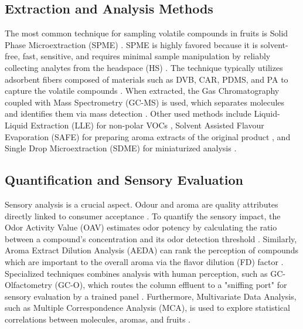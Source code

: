 \subsection{Extraction and Analysis Methods}
The most common technique for sampling volatile compounds in fruits is Solid Phase Microextraction (SPME) \cite*{A01_Aguirre-Lopez_2023}. SPME is highly favored because it is solvent-free, fast, sensitive, and requires minimal sample manipulation by reliably collecting analytes from the headspace (HS) \cite*{A01_Aguirre-Lopez_2023,A03_PanoFarias2017}. The technique typically utilizes adsorbent fibers composed of materials such as DVB, CAR, PDMS, and PA to capture the volatile compounds \cite*{A01_Aguirre-Lopez_2023}. When extracted, the Gas Chromatography coupled with Mass Spectrometry (GC-MS) is used, which separates molecules and identifies them via mass detection \cite*{A01_Aguirre-Lopez_2023}. Other used methods include Liquid-Liquid Extraction (LLE) for non-polar VOCs \cite*{A01_Aguirre-Lopez_2023}, Solvent Assisted Flavour Evaporation (SAFE) for preparing aroma extracts of the original product \cite*{A01_Aguirre-Lopez_2023}, and Single Drop Microextraction (SDME) for miniaturized analysis \cite*{A03_PanoFarias2017}.


\subsection{Quantification and Sensory Evaluation}
Sensory analysis is a crucial aspect. Odour and aroma are quality attributes directly linked to consumer acceptance \cite*{A01_Aguirre-Lopez_2023}. To quantify the sensory impact, the Odor Activity Value (OAV) estimates odor potency by calculating the ratio between a compound's concentration and its odor detection threshold \cite*{A01_Aguirre-Lopez_2023,A07_Bonneau2016}. Similarly, Aroma Extract Dilution Analysis (AEDA) can rank the perception of compounds which are important to the overall aroma via the flavor dilution (FD) factor \cite*{A01_Aguirre-Lopez_2023,A07_Bonneau2016}. Specialized techniques combines analysis with human perception, such as GC-Olfactometry (GC-O), which routes the column effluent to a "sniffing port" for sensory evaluation by a trained panel \cite*{A01_Aguirre-Lopez_2023}. Furthermore, Multivariate Data Analysis, such as Multiple Correspondence Analysis (MCA), is used to explore statistical correlations between molecules, aromas, and fruits \cite*{A01_Aguirre-Lopez_2023,A15_Xie2023}.


